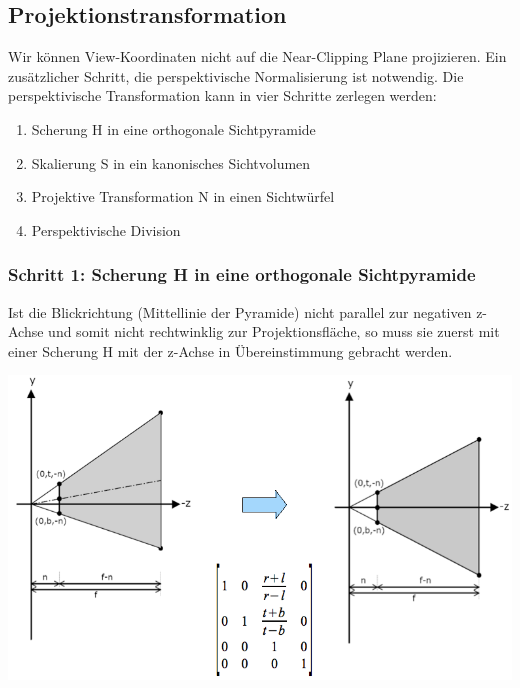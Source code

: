 \documentclass[10pt]{article}
\begin{document}
\subsection{Projektionstransformation}
Wir können View-Koordinaten nicht auf die Near-Clipping Plane projizieren. Ein zusätzlicher Schritt, die perspektivische Normalisierung ist notwendig. Die perspektivische Transformation kann in vier Schritte zerlegen werden:
\begin{enumerate}
	\item Scherung H in eine orthogonale Sichtpyramide
	\item Skalierung S in ein kanonisches Sichtvolumen
	\item Projektive Transformation N in einen Sichtwürfel 
	\item Perspektivische Division
\end{enumerate}
\subsubsection{Schritt 1: Scherung H in eine orthogonale Sichtpyramide}
Ist die Blickrichtung (Mittellinie der Pyramide) nicht parallel zur negativen z-Achse und somit nicht rechtwinklig zur Projektionsfläche, so muss sie zuerst mit einer Scherung H mit der z-Achse in Übereinstimmung gebracht werden.
\begin{center}
	\includegraphics[scale=0.2]{projektionstransformation1.png}
\end{center}
\end{document}
